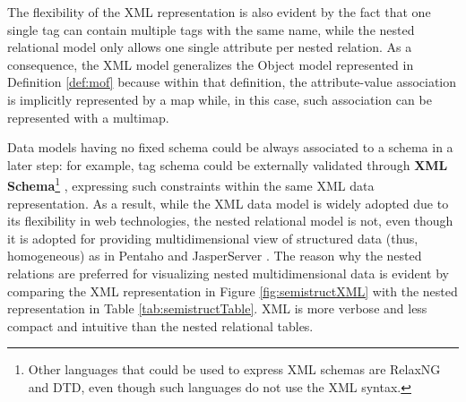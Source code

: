 The flexibility of the XML representation is also evident by the fact that one single tag can contain multiple tags with the same name, while the nested relational model only allows one single attribute per nested relation. As a consequence, the XML model generalizes the Object model represented in Definition \vref{def:mof} because within that definition, the attribute-value association is implicitly represented by a map while, in this case, such association can be represented with a multimap.

Data models having no fixed schema could be always associated to a schema in a later step: for example, tag schema could be externally validated through \textbf{XML Schema}\footnote{Other languages that could be used to express XML schemas are RelaxNG and DTD, even though such languages do not use the XML syntax.} \cite{VlistXS}, expressing such constraints within the same XML data representation. As a result, while the XML data model is widely adopted due to its flexibility in web technologies, the nested relational model is not, even though it is adopted for providing multidimensional view of structured data (thus, homogeneous) as in Pentaho \cite{Pentaho} and JasperServer \cite{Parra}. The reason why the nested relations are preferred for visualizing nested multidimensional data is evident by comparing the XML representation in Figure \ref{fig:semistructXML} with the nested representation in Table \ref{tab:semistructTable}. XML is more verbose and less compact and intuitive than  the nested relational tables.


